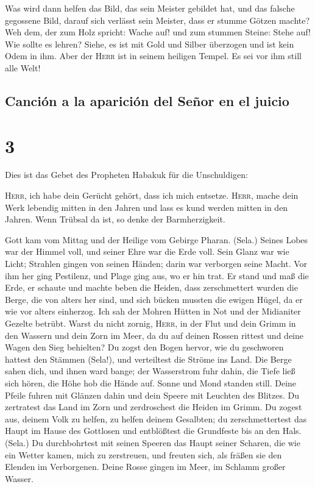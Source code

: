  Was wird dann helfen das Bild, das sein Meister gebildet
hat, und das falsche gegossene Bild, darauf sich verlässt sein Meister,
dass er stumme Götzen machte?  Weh dem, der zum Holz
spricht: Wache auf! und zum stummen Steine: Stehe auf! Wie sollte es
lehren? Siehe, es ist mit Gold und Silber überzogen und ist kein Odem in
ihm.  Aber der \textsc{Herr} ist in seinem heiligen
Tempel. Es sei vor ihm still alle Welt!

\hypertarget{canciuxf3n-a-la-apariciuxf3n-del-seuxf1or-en-el-juicio}{%
\subsection{Canción a la aparición del Señor en el
juicio}\label{canciuxf3n-a-la-apariciuxf3n-del-seuxf1or-en-el-juicio}}

\hypertarget{section-2}{%
\section{3}\label{section-2}}

 Dies ist das Gebet des Propheten Habakuk für die
Unschuldigen:

 \textsc{Herr}, ich habe dein Gerücht gehört, dass ich
mich entsetze. \textsc{Herr}, mache dein Werk lebendig mitten in den
Jahren und lass es kund werden mitten in den Jahren. Wenn Trübsal da
ist, so denke der Barmherzigkeit.

 Gott kam vom Mittag und der Heilige vom Gebirge Pharan.
(Sela.) Seines Lobes war der Himmel voll, und seiner Ehre war die Erde
voll.  Sein Glanz war wie Licht; Strahlen gingen von
seinen Händen; darin war verborgen seine Macht.  Vor ihm
her ging Pestilenz, und Plage ging aus, wo er hin trat. 
Er stand und maß die Erde, er schaute und machte beben die Heiden, dass
zerschmettert wurden die Berge, die von alters her sind, und sich bücken
mussten die ewigen Hügel, da er wie vor alters einherzog. 
Ich sah der Mohren Hütten in Not und der Midianiter Gezelte betrübt.
 Warst du nicht zornig, \textsc{Herr}, in der Flut und
dein Grimm in den Wassern und dein Zorn im Meer, da du auf deinen Rossen
rittest und deine Wagen den Sieg behielten?  Du zogst den
Bogen hervor, wie du geschworen hattest den Stämmen (Sela!), und
verteiltest die Ströme ins Land.  Die Berge sahen dich,
und ihnen ward bange; der Wasserstrom fuhr dahin, die Tiefe ließ sich
hören, die Höhe hob die Hände auf.  Sonne und Mond
standen still. Deine Pfeile fuhren mit Glänzen dahin und dein Speere mit
Leuchten des Blitzes.  Du zertratest das Land im Zorn und
zerdroschest die Heiden im Grimm.  Du zogest aus, deinem
Volk zu helfen, zu helfen deinem Gesalbten; du zerschmettertest das
Haupt im Hause des Gottlosen und entblößtest die Grundfeste bis an den
Hals. (Sela.)  Du durchbohrtest mit seinen Speeren das
Haupt seiner Scharen, die wie ein Wetter kamen, mich zu zerstreuen, und
freuten sich, als fräßen sie den Elenden im Verborgenen. 
Deine Rosse gingen im Meer, im Schlamm großer Wasser.

